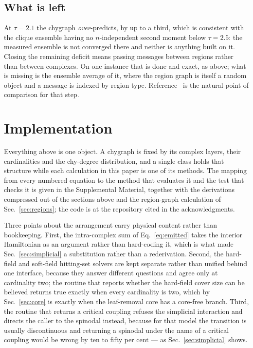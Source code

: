 \documentclass[aps,pre,twocolumn,superscriptaddress,floatfix]{revtex4-2}
\begin{document}
\subsection{What is left}

At $\tau=2.1$ the chygraph \emph{over}-predicts, by up
to a third, which is consistent with the clique ensemble having no
$n$-independent second moment below $\tau=2.5$: the measured ensemble is not
converged there and neither is anything built on it. Closing the remaining
deficit means passing messages between regions rather than between complexes.
On one instance that is done and exact, as above; what is missing is the
ensemble average of it, where the region graph is itself a random object and a
message is indexed by region type. Reference~\cite{CN19} is the natural point of
comparison for that step.

\section{Implementation}
\label{sec:code}

Everything above is one object. A chygraph is fixed by its complex layers, their
cardinalities and the chy-degree distribution, and a single class holds that
structure while each calculation in this paper is one of its methods. The
mapping from every numbered equation to the method that evaluates it and the
test that checks it is given in the Supplemental Material, together with the
derivations compressed out of the sections above and the region-graph
calculation of Sec.~\ref{sec:regions}; the code is at the repository cited in
the acknowledgments.

Three points about the arrangement carry physical content rather than
bookkeeping. First, the intra-complex sum of Eq.~\eqref{eq:emitted} takes the
interior Hamiltonian as an argument rather than hard-coding it, which is what
made Sec.~\ref{sec:simplicial} a substitution rather than a rederivation.
Second, the hard-field and soft-field hitting-set solvers are kept separate
rather than unified behind one interface, because they answer different
questions and agree only at cardinality two; the routine that reports whether
the hard-field cover size can be believed returns true exactly when every
cardinality is two, which by Sec.~\ref{sec:core} is exactly when the
leaf-removal core has a core-free branch. Third, the routine that returns a
critical coupling refuses the simplicial interaction and directs the caller to
the spinodal instead, because for that model the transition is usually
discontinuous and returning a spinodal under the name of a critical coupling
would be wrong by ten to fifty per cent --- as Sec.~\ref{sec:simplicial} shows.
\end{document}

